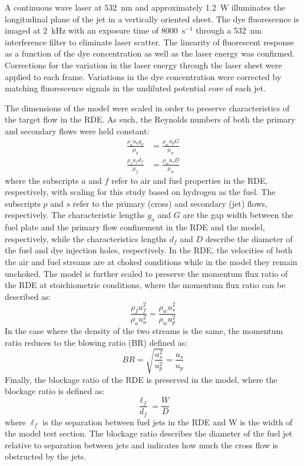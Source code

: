 \documentclass[10pt, twocolumn]{article}
\begin{document}
A continuous wave laser at 532~nm and approximately 1.2~W illuminates the longitudinal plane of the jet in a vertically oriented sheet. The dye fluorescence is imaged at 2~kHz with an exposure time of 8000~$\textrm{s}^{-1}$ through a 532~nm interference filter to eliminate laser scatter. The linearity of fluorescent response as a function of the dye concentration as well as the laser energy was confirmed. Corrections for the variation in the laser energy through the laser sheet were applied to each frame. Variations in the dye concentration were corrected by matching fluorescence signals in the undiluted potential core of each jet.

The dimensions of the model were scaled in order to preserve characteristics of the target flow in the RDE. As such, the Reynolds numbers of both the primary and secondary flows were held constant:
\begin{align}
\frac{\rho_au_ag_a}{\mu_a}&=\frac{\rho_wu_pG}{\mu_w} \label{eqn:1}\\
\frac{\rho_fu_fd_f}{\mu_f}&=\frac{\rho_wu_sD}{\mu_w} \label{eqn:2}
\end{align}
where the subscripts $a$ and $f$ refer to air and fuel properties in the RDE, respectively, with scaling for this study based on hydrogen as the fuel. The subscripts $p$ and $s$ refer to the primary (cross) and secondary (jet) flows, respectively. The characteristic lengths $g_a$ and $G$ are the gap width between the fuel plate and the primary flow confinement in the RDE and the model, respectively, while the characteristics lengths $d_f$ and $D$ describe the diameter of the fuel and dye injection holes, respectively. In the RDE, the velocities of both the air and fuel streams are at choked conditions while in the model they remain unchoked. The model is further scaled to preserve the momentum flux ratio of the RDE at stoichiometric conditions, where the momentum flux ratio can be described as:
\begin{equation}
\frac{\rho_fu_f^2}{\rho_au_a^2}=\frac{\rho_wu_s^2}{\rho_wu_p^2}
\label{eqn:3}
\end{equation}
In the case where the density of the two streams is the same, the momentum ratio reduces to the blowing ratio (BR) defined as:
\begin{equation}
BR=\sqrt{\frac{u_s^2}{u_p^2}}=\frac{u_s}{u_p}
\label{eqn:4}
\end{equation}
Finally, the blockage ratio of the RDE is preserved in the model, where the blockage ratio is defined as:
\begin{equation}
\frac{\ell_f}{d_f}=\frac{W}{D}
\label{eqn:5}
\end{equation}
where $\ell_f$ is the separation between fuel jets in the RDE and W is the width of the model test section. The blockage ratio describes the diameter of the fuel jet relative to separation between jets and indicates how much the cross flow is obstructed by the jets.
\end{document}
